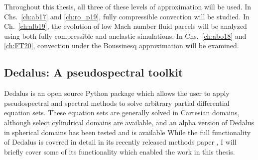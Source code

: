 Throughout this thesis, all three of these levels of approximation will be used.
In Chs.~\ref{ch:ab17} and \ref{ch:ro_p19}, fully compressible convection will be studied.
In Ch.~\ref{ch:alb19}, the evolution of low Mach number fluid parcels will be analyzed using both fully compressible and anelastic simulations.
In Chs.~\ref{ch:abo18} and \ref{ch:FT20}, convection under the Boussinesq approximation will be examined.

\subsection{Dedalus: A pseudospectral toolkit}
\label{sct:dedalus}
Dedalus is an open source Python package which allows the user to apply pseudospectral and spectral methods to solve arbitrary partial differential equation sets.
These equation sets are generally solved in Cartesian domains, although select cylindrical domains are available, and an alpha version of Dedalus in spherical domains has been tested and is available \citep{vasil&all2019, lecoanet&all2019}
While the full functionality of Dedalus is covered in detail in its recently released methods paper \citep{burns&all2019}, I will briefly cover some of its functionality which enabled the work in this thesis.

